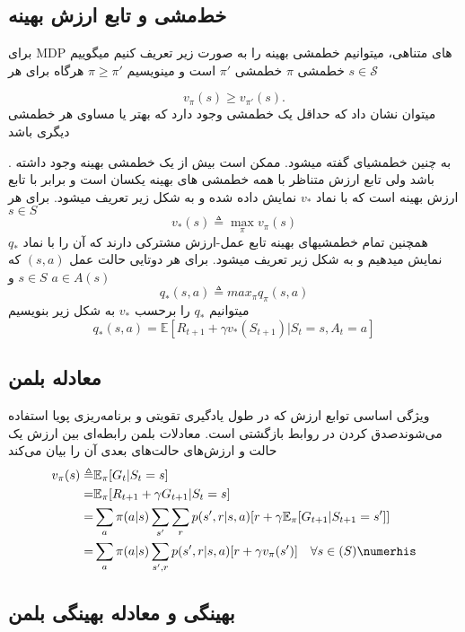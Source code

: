 \subsection{خط‌مشی و تابع ارزش بهینه}

برای MDP های متناهی، می\nf توانیم خط\nf مشی بهینه را به صورت زیر تعریف کنیم
می\nf گوییم خط\nf مشی $\pi$  خط\nf مشی 
$\pi'$
است و می\nf نویسیم 
$\pi \ge \pi'$
هرگاه برای هر 
$s \in \mathcal{S}$

$$v_\pi(s) \ge v_{\pi'}(s).$$
 می\nf توان نشان داد که حداقل یک خط\nf مشی وجود دارد که بهتر یا مساوی هر خط\nf مشی دیگری باشد

\cite{suttonbook}
. به چنین خط\nf مشی\nf ای  گفته می\nf شود. ممکن است بیش از یک خط\nf مشی بهینه وجود داشته باشد ولی تابع ارزش متناظر با همه خط\nf مشی \nf های بهینه یکسان است و برابر با تابع ارزش بهینه است که با نماد $v_*$ نمایش داده شده و به شکل زیر تعریف می\nf شود. برای هر $s \in S$
$$v_*(s) \triangleq \max_{\pi} v_\pi(s)$$
همچنین تمام خط\nf مشی\nf های بهینه تابع عمل-ارزش مشترکی دارند که آن را با نماد $q_*$ نمایش می\nf دهیم و به شکل زیر تعریف می\nf شود. برای هر دوتایی حالت عمل $(s,a)$ که $s \in S$ و $a \in A(s)$
$$q_*(s,a) \triangleq max_{\pi} q_\pi(s,a)$$
می\nf توانیم $q_*$ را برحسب $v_*$ به شکل زیر بنویسیم
\begin{equation}
q_* (s,a) = \mathbb{E}[R_{t+1} + \gamma v_*(S_{t+1})| S_t=s, A_t=a]
\end{equation}

\subsection{معادله بلمن}

ویژگی اساسی توابع ارزش که در طول یادگیری تقویتی و برنامه‌ریزی پویا استفاده می‌شوندصدق کردن در روابط بازگشتی است. معادلات بلمن رابطه‌ای بین ارزش یک حالت و ارزش‌های حالت‌های بعدی آن را بیان می‌کند
\begin{align}
v_\pi (s) \triangleq& \mathbb{E}_\pi [G_t | S_t = s] \nonumber \\
=& \mathbb{E}_\pi [R_{t+1}+ \gamma G_{t+1}|S_t=s] \nonumber \\
=&\sum_{a} \pi(a|s) \sum_{s'}\sum_{r} p(s',r|s,a)[r+\gamma \mathbb{E}_\pi[G_{t+1}|S_{t+1}=s']] \nonumber\\
=&\sum_{a} \pi(a|s) \sum_{s',r} p(s',r|s,a)[r+\gamma v_\pi(s')] \quad \forall s \in \mathbb(S) \numerhis 
\label{bellman}
\end{align}
\subsection{بهینگی و معادله بهینگی بلمن}

